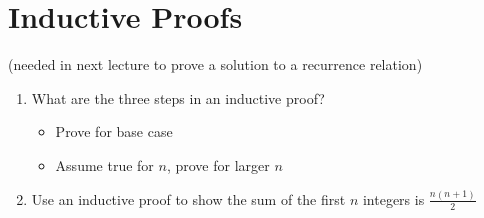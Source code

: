 \documentclass[12pt]{report}
\newcommand{\sectiontype}{\section}
\begin{document}
\sectiontype{Inductive Proofs} (needed in next lecture to prove a solution to a recurrence relation)
\begin{enumerate}[label=\arabic*),start=6]
    \item What are the three steps in an inductive proof?
	\begin{itemize}
		\item Prove for base case
		\item Assume true for $n$, prove for larger $n$
	\end{itemize}
    \item Use an inductive proof to show the sum of the first $n$ integers is $\frac{n(n+1)}{2}$
\end{enumerate}
\end{document}
